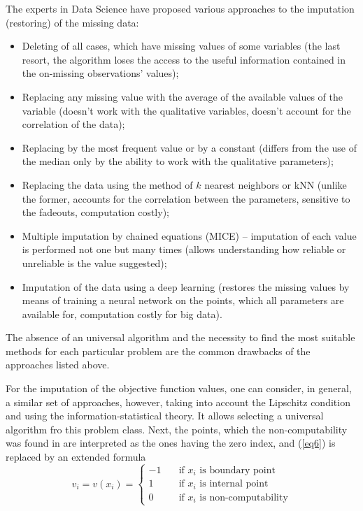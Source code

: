 \documentclass[runningheads]{llncs}
\begin{document}
The experts in Data Science have proposed various approaches to the imputation (restoring) of the missing data:
\begin{itemize}
  \item Deleting of all cases, which have missing values of some variables (the last resort, the algorithm loses the access to the useful information contained in the on-missing observations’ values);
  \item Replacing any missing value with the average of the available values of the variable (doesn’t work with the qualitative variables, doesn’t account for the correlation of the data);
  \item Replacing by the most frequent value or by a constant (differs from the use of the median only by the ability to work with the qualitative parameters);
  \item Replacing the data using the method of $k$ nearest neighbors or kNN (unlike the former, accounts for the correlation between the parameters, sensitive to the fadeouts, computation costly);
  \item Multiple imputation by chained equations (MICE) – imputation of each value is performed not one but many times (allows understanding how reliable or unreliable is the value suggested);
  \item Imputation of the data using a deep learning (restores the missing values by means of training a neural network on the points, which all parameters are available for, computation costly for big data).
\end{itemize}

The absence of an universal algorithm and the necessity to find the most suitable methods for each particular problem are the common drawbacks of the approaches listed above.

For the imputation of the objective function values, one can consider, in general, a similar set of approaches, however, taking into account the Lipschitz condition and using the information-statistical theory. It allows selecting a universal algorithm fro this problem class. Next, the points, which the non-computability was found in are interpreted as the ones having the zero index, and (\ref{eq6}) is replaced by an extended formula
\begin{equation}\label{eq12} 
v_i=v(x_i)=
  \begin{cases}
    -1 & {\quad \text{if } x_i \text{ is boundary point}}\\
    1  & {\quad \text{if } x_i \text{ is internal point}}\\
    0  & {\quad \text{if } x_i \text{ is non-computability}}
  \end{cases}
\end{equation}
\end{document}
